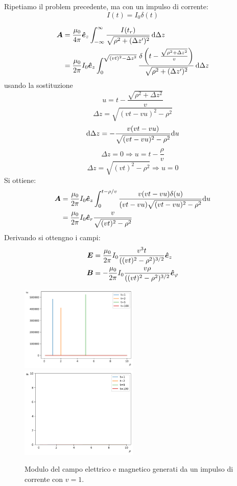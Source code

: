 \begin{Es}
  Ripetiamo il problem precedente, ma con un impulso di corrente:
  \[
    I(t) = I_0\delta(t)
  \]

  \begin{align*}
    \boldsymbol{A} & = \frac{\mu_0}{4\pi}\boldsymbol{\hat {e}}_z\int_{-\infty}^{\infty} \frac{I(t_r)}{\sqrt{\rho^2 + (\Delta z')^2}}\,\mathrm{d} \Delta z                                                                      \\
          & = \frac{\mu_0}{2\pi}I_0 \boldsymbol{\hat {e}}_z\int_{0}^{\sqrt{(vt)^2-\Delta z^2}} \frac{\delta\left(t - \frac{\sqrt{\rho^2 + \Delta z^2}}{v}\right)}{\sqrt{\rho^2 + (\Delta z')^2}}\,\mathrm{d} \Delta z
  \end{align*}
  usando la sostituzione
  \[u = t - \frac{\sqrt{\rho^2 + \Delta z^2}}{v}\]
  \[ \Delta z = \sqrt{(vt - vu)^2 - \rho^2} \]
  \[ \mathrm{d} \Delta z = -\frac{v(vt - vu)}{\sqrt{(vt - vu)^2 - \rho^2}}\mathrm{d} u \]
  \[ \Delta z=0 \Rightarrow u = t - \frac{\rho}{v} \]
  \[ \Delta z = \sqrt{(vt)^2 - \rho^2} \Rightarrow u = 0 \]
  Si ottiene:
  \begin{align*}
    \boldsymbol{A} & = \frac{\mu_0}{2\pi}I_0 \boldsymbol{\hat {e}}_z\int_0^{t - \rho/v}\frac{v(vt - vu)\delta(u)}{(vt-vu)\sqrt{(vt - vu)^2 - \rho^2}}\mathrm{d} u \\
          & = \frac{\mu_0}{2\pi} I_0 \boldsymbol{\hat {e}}_r \frac{v}{\sqrt{(vt)^2 - \rho^2}}
  \end{align*}
  Derivando si ottengno i campi:
  \begin{align*}
    \boldsymbol{E} &= \frac{\mu_0}{2\pi}I_0\frac{v^3t}{((vt)^2 - \rho^2)^{3/2}}\boldsymbol{\hat {e}}_z \\
    \boldsymbol{B} &= -\frac{\mu_0}{2\pi}I_0\frac{v\rho}{((vt)^2 - \rho^2)^{3/2}}\boldsymbol{\hat {e}}_\varphi
  \end{align*}
  \begin{figure}
    \includegraphics[width=0.5\textwidth]{immagini/fisica2/cavo_corrente_potenziali_ritardati_delta_E.pdf}
    \includegraphics[width=0.5\textwidth]{immagini/fisica2/cavo_corrente_potenziali_ritardati_delta_B.pdf}
    \caption{Modulo del campo elettrico e magnetico generati da un impulso di corrente con $v=1$.}
    \end{figure}
\end{Es}


